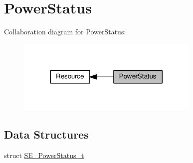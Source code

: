 \hypertarget{group__PowerStatus}{}\section{Power\+Status}
\label{group__PowerStatus}
Collaboration diagram for Power\+Status\+:\nopagebreak
\begin{figure}[H]
\begin{center}
\leavevmode
\includegraphics[width=248pt]{group__PowerStatus}
\end{center}
\end{figure}
\subsection*{Data Structures}
\begin{DoxyCompactItemize}
\item 
struct \hyperlink{structSE__PowerStatus__t}{S\+E\+\_\+\+Power\+Status\+\_\+t}
\end{DoxyCompactItemize}
